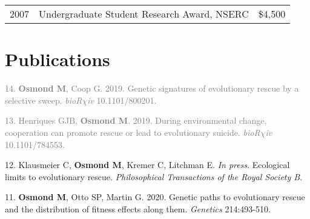\documentclass[12pt]{article}
\begin{document}
\begin{tabular}{llr}
  2007 & Undergraduate Student Research Award, NSERC & \$4,500\\
\end{tabular}

\section*{Publications}

\noindent\hspace{.1cm}\textcolor{gray}{14. \textbf{Osmond M}, Coop G. 2019. Genetic signatures of evolutionary rescue by a selective sweep. \textit{bioR$\chi$iv} 10.1101/800201.}

\noindent\hspace{.1cm}\textcolor{gray}{13. Henriques GJB, \textbf{Osmond M}. 2019. During environmental change, cooperation can promote rescue or lead to evolutionary suicide. \textit{bioR$\chi$iv} 10.1101/784553.}

\noindent\hspace{.1cm}12. Klausmeier C, \textbf{Osmond M}, Kremer C, Litchman E. \textit{In press}. Ecological limits to evolutionary rescue. \textit{Philosophical Transactions of the Royal Society B}.

\noindent\hspace{.1cm}11. \textbf{Osmond M}, Otto SP, Martin G. 2020. Genetic paths to evolutionary rescue and the distribution of fitness effects along them. \textit{Genetics} 214:493-510.
\end{document}

